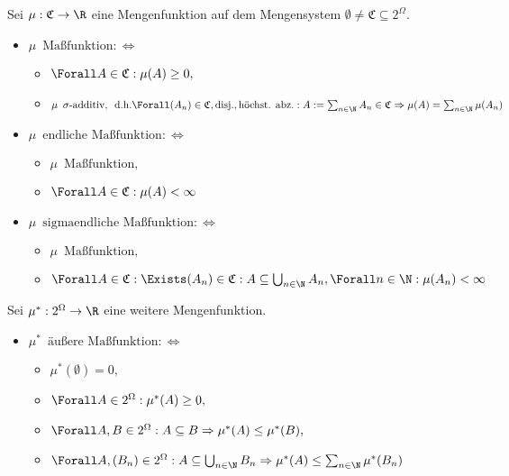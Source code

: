 \begin{solution}

Sei $\mu: \mathfrak{C} \to \R$ eine Mengenfunktion auf dem Mengensystem $\emptyset \neq \mathfrak{C} \subseteq 2^\Omega$.

\begin{itemize}

  \item $\mu \enspace \text{Maßfunktion} : \Leftrightarrow$
  \begin{itemize}
    \item $\Forall A \in \mathfrak{C}: \mu(A) \geq 0,$
    \item $\mu \enspace \sigma \text{-additiv}, \enspace
    \text{d.h.}
    \Forall (A_n) \in \mathfrak{C}, \text{disj.}, \text{höchst. abz.}:
    A := \sum_{n \in \N} A_n \in \mathfrak{C} \Rightarrow
    \mu(A) = \sum_{n \in \N} \mu(A_n)$
  \end{itemize}

  \item $\mu \enspace \text{endliche Maßfunktion} : \Leftrightarrow$
  \begin{itemize}
    \item $\mu \enspace \text{Maßfunktion},$
    \item $\Forall A \in \mathfrak{C}: \mu(A) < \infty$
  \end{itemize}

  \item $\mu \enspace \text{sigmaendliche Maßfunktion} : \Leftrightarrow$
  \begin{itemize}
    \item $\mu \enspace \text{Maßfunktion},$
    \item $\Forall A \in \mathfrak{C}: \Exists (A_n) \in \mathfrak{C}: A \subseteq \bigcup_{n \in \N} A_n, \Forall n \in \N: \mu(A_n) < \infty$
  \end{itemize}

\end{itemize}

Sei $\mu^\ast: 2^\Omega \to \R$ eine weitere Mengenfunktion.

\begin{itemize}

  \item $\mu^\ast \enspace \text{äußere Maßfunktion} : \Leftrightarrow$
  \begin{itemize}
    \item $\mu^\ast(\emptyset) = 0,$
    \item $\Forall A \in 2^\Omega: \mu^\ast(A) \geq 0,$
    \item $\Forall A, B \in 2^\Omega:
    A \subseteq B \Rightarrow
    \mu^\ast(A) \leq \mu^\ast(B),$
    \item $\Forall A, (B_n) \in 2^\Omega:
    A \subseteq \bigcup_{n \in \N} B_n \Rightarrow
    \mu^\ast(A) \leq \sum_{n \in \N} \mu^\ast(B_n)$
  \end{itemize}


\end{itemize}
\end{solution}
